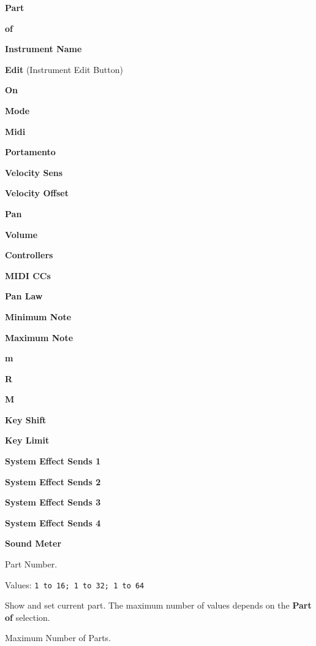    \begin{enumber}
      \item \textbf{Part}
      \item \textbf{of}
      \item \textbf{Instrument Name}
      \item \textbf{Edit} (Instrument Edit Button)
      \item \textbf{On}
      \item \textbf{Mode}
      \item \textbf{Midi}
      \item \textbf{Portamento}
      \item \textbf{Velocity Sens}
      \item \textbf{Velocity Offset}
      \item \textbf{Pan}
      \item \textbf{Volume}
      \item \textbf{Controllers}
      \item \textbf{MIDI CCs}
      \item \textbf{Pan Law}
      \item \textbf{Minimum Note}
      \item \textbf{Maximum Note}
      \item \textbf{m}
      \item \textbf{R}
      \item \textbf{M}
      \item \textbf{Key Shift}
      \item \textbf{Key Limit}
      \item \textbf{System Effect Sends 1}
      \item \textbf{System Effect Sends 2}
      \item \textbf{System Effect Sends 3}
      \item \textbf{System Effect Sends 4}
      \item \textbf{Sound Meter}
   \end{enumber}

   \setcounter{ItemCounter}{0}      %

   Part Number.

   Values: \texttt{1 to 16; 1 to 32; 1 to 64 }

   Show and set current part.  The maximum number of values depends on the
   \textbf{Part of} selection.

   Maximum Number of Parts.

